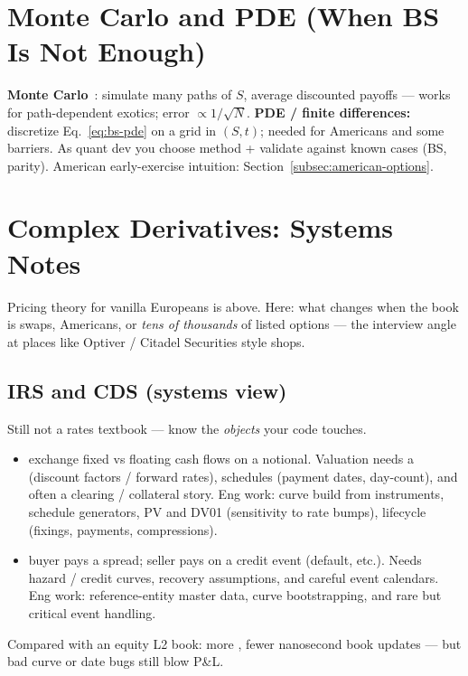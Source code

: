 \section{Monte Carlo and PDE (When BS Is Not Enough)}
\label{sec:monte-carlo}
\textbf{Monte Carlo}~\cite{wiki-monte-carlo}: simulate many paths of $S$, average discounted 
payoffs --- works for path-dependent exotics; error $\propto 1/\sqrt{N}$.
\newline
\textbf{PDE / finite differences:} discretize Eq.~\eqref{eq:bs-pde} on a grid in $(S,t)$; 
needed for Americans and some barriers. As quant dev you choose method + validate against 
known cases (BS, parity). American early-exercise intuition: 
Section~\ref{subsec:american-options}.

\section{Complex Derivatives: Systems Notes}
\label{sec:complex-derivatives-systems}
Pricing theory for vanilla Europeans is above. Here: what changes when the book is 
swaps, Americans, or \emph{tens of thousands} of listed options --- the interview 
angle at places like Optiver / Citadel Securities style shops.

\subsection{IRS and CDS (systems view)}
\label{subsec:irs-cds-systems}
Still not a rates textbook --- know the \emph{objects} your code touches.
\begin{itemize}
    \item {} exchange fixed vs floating cash flows 
          on a notional. Valuation needs a  (discount factors / 
          forward rates), schedules (payment dates, day-count), and often a clearing 
          / collateral story. Eng work: curve build from instruments, schedule 
          generators, PV and DV01 (sensitivity to rate bumps), lifecycle 
          (fixings, payments, compressions).
    \item {} buyer pays a spread; seller pays 
          on a credit event (default, etc.). Needs hazard / credit curves, recovery 
          assumptions, and careful event calendars. Eng work: reference-entity 
          master data, curve bootstrapping, and rare but critical event handling.
\end{itemize}
Compared with an equity L2 book: more , 
fewer nanosecond book updates --- but bad curve or date bugs still blow P\&L.

